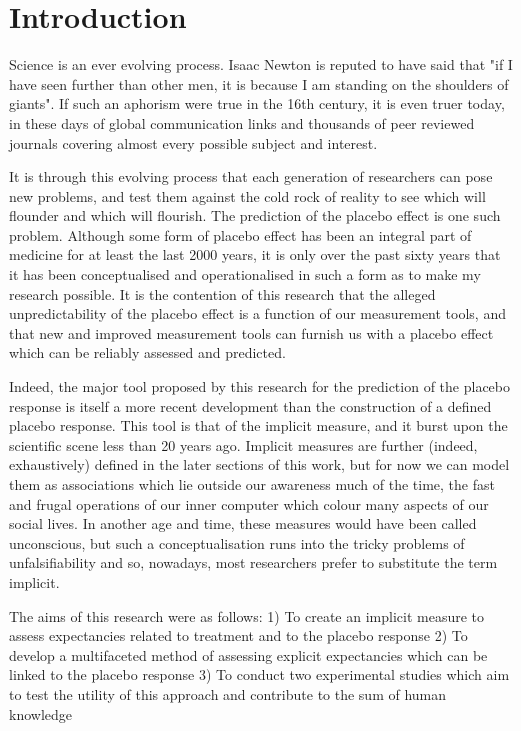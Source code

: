 \chapter{Introduction}

Science is an ever evolving process. Isaac Newton is reputed to have said that "if I have seen further than other men, it is because I am standing on the shoulders of giants". If such an aphorism were true in the 16th century, it is even truer today, in these days of global communication links and thousands of peer reviewed journals covering almost every possible subject and interest. 

It is through this evolving process that each generation of researchers can pose new problems, and test them against the cold rock of reality to see which will flounder and which will flourish. The prediction of the placebo effect is one such problem. Although some form of placebo effect has been an integral part of medicine for at least the last 2000 years, it is only over the past sixty years that it has been conceptualised and operationalised in such a form as to make my research possible. It is the contention of this research that the alleged unpredictability of the placebo effect is a function of our measurement tools, and that new and improved measurement tools can furnish us with a placebo effect which can be reliably assessed and predicted. 

Indeed, the major tool proposed by this research for the prediction of the placebo response is itself a more recent development than the construction of a defined placebo response. This tool is that of the implicit measure, and it burst upon the scientific scene less than 20 years ago. Implicit measures are further (indeed, exhaustively) defined in the later sections of this work, but for now we can model them as associations which lie outside our awareness much of the time, the fast and frugal operations of our inner computer which colour many aspects of our social lives. In another age and time, these measures would have been called unconscious, but such a conceptualisation runs into the tricky problems of unfalsifiability and so, nowadays, most researchers prefer to substitute the term implicit. 

The aims of this research were as follows:
1)	To create an implicit measure to assess expectancies related to treatment and to the placebo response
2)	To develop a multifaceted method of assessing explicit expectancies which can be linked to the placebo response
3)	To conduct two experimental studies which aim to test the utility of this approach and contribute to the sum of human knowledge

